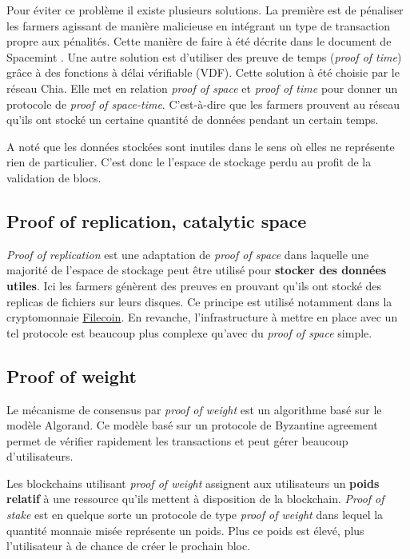 Pour éviter ce problème il existe plusieurs solutions. La première est de pénaliser les farmers agissant de manière malicieuse en intégrant un type de transaction propre aux pénalités. Cette manière de faire à été décrite dans le document de Spacemint \cite{DBLP:conf/fc/ParkKFGAP18}. Une autre solution est d'utiliser des preuve de temps (\textit{proof of time}) grâce à des fonctions à délai vérifiable (VDF). Cette solution à été choisie par le réseau Chia. Elle met en relation \textit{proof of space} et \textit{proof of time} pour donner un protocole de \textit{proof of space-time}. C'est-à-dire que les farmers prouvent au réseau qu'ils ont stocké un certaine quantité de données pendant un certain temps.

A noté que les données stockées sont inutiles dans le sens où elles ne représente rien de particulier. C'est donc le l'espace de stockage perdu au profit de la validation de blocs.

\subsection{Proof of replication, catalytic space}

\textit{Proof of replication} est une adaptation de \textit{proof of space} dans laquelle une majorité de l'espace de stockage peut être utilisé pour \textbf{stocker des données utiles}. Ici les farmers génèrent des preuves en prouvant qu'ils ont stocké des replicas de fichiers sur leurs disques. Ce principe est utilisé notamment dans la cryptomonnaie \href{https://filecoin.io/}{Filecoin}. En revanche, l'infrastructure à mettre en place avec un tel protocole est beaucoup plus complexe qu'avec du \textit{proof of space} simple.

\subsection{Proof of weight}

Le mécanisme de consensus par \textit{proof of weight} est un algorithme basé sur le modèle Algorand. Ce modèle basé sur un protocole de Byzantine agreement permet de vérifier rapidement les transactions et peut gérer beaucoup d'utilisateurs. 

Les blockchains utilisant \textit{proof of weight} assignent aux utilisateurs un \textbf{poids relatif} à une ressource qu'ils mettent à disposition de la blockchain. \textit{Proof of stake} est en quelque sorte un protocole de type \textit{proof of weight} dans lequel la quantité monnaie misée représente un poids. Plus ce poids est élevé, plus l'utilisateur à de chance de créer le prochain bloc.

